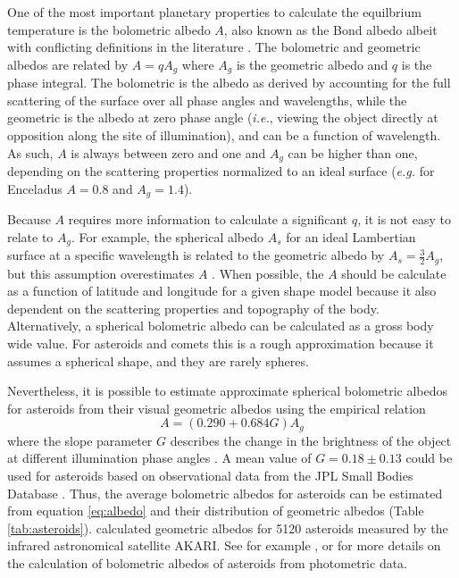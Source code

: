 \documentclass[a4paper,fleqn,usenatbib]{mnras}
\begin{document}
One of the most important planetary properties to calculate the equilbrium temperature is the bolometric albedo $A$, also known as the Bond albedo albeit with conflicting definitions in the literature \citep{1916PNAS....2...74R, 1981A&A...104...42H, 1999PCEC...24..573G,2016AJ....152..209M}. The bolometric and geometric albedos are related by $A = qA_g$ where $A_g$ is the geometric albedo and $q$ is the phase integral. The bolometric is the albedo as derived by accounting for the full scattering of the surface over all phase angles and wavelengths, while the geometric is the albedo at zero phase angle (\emph{i.e.}, viewing the object directly at opposition along the site of illumination), and can be a function of wavelength. As such, $A$ is always between zero and one and $A_g$ can be higher than one, depending on the scattering properties normalized to an ideal surface (\emph{e.g.} for Enceladus $A=0.8$ and $A_g=1.4$).

Because $A$ requires more information to calculate a significant $q$, it is not easy to relate to $A_g$. For example, the spherical albedo $A_s$ for an ideal Lambertian surface at a specific wavelength is related to the geometric albedo by $A_s=\frac{3}{2}A_g$, but this assumption overestimates $A$ \citep{2016ApJ...822...76D}. When possible, the $A$ should be calculate as a function of latitude and longitude for a given shape model because it also dependent on the scattering properties and topography of the body. Alternatively, a spherical bolometric albedo can be calculated as a gross body wide value. For asteroids and comets this is a rough approximation because it assumes a spherical shape, and they are rarely spheres.

Nevertheless, it is possible to estimate approximate spherical bolometric albedos for asteroids from their visual geometric albedos using the empirical relation
\begin{equation} \label{eq:albedo}
A=(0.290+0.684G)A_g
\end{equation}
where the slope parameter $G$ describes the change in the brightness of the object at different illumination phase angles \citep{2008Icar..195..674S}. A mean value of $G = 0.18 \pm 0.13$ could be used for asteroids based on observational data from the JPL Small Bodies Database \citep{2013PhDT.......424C}. Thus, the average bolometric albedos for asteroids can be estimated from equation \ref{eq:albedo} and their distribution of geometric albedos (Table \ref{tab:asteroids}). \citet{2013ApJ...762...56U} calculated geometric albedos for 5120 asteroids measured by the infrared astronomical satellite AKARI. See for example \citet{1989aste.conf..524B}, \citet{2011LPI....42.1028S} or \citet{2013Icar..226.1252L} for more details on the calculation of bolometric albedos of asteroids from photometric data.  
\end{document}
